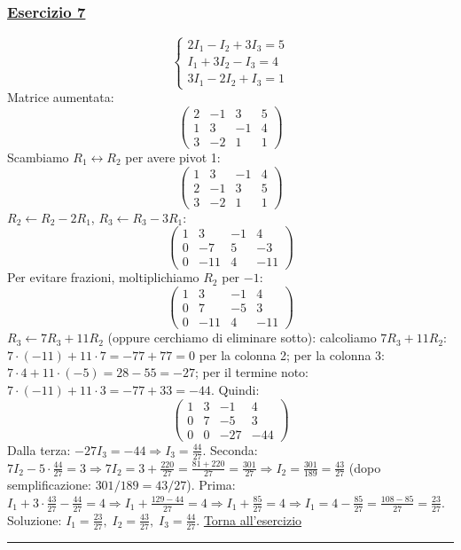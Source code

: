 \subsubsection*{\hyperref[ex:7]{Esercizio 7}}
\[
\begin{cases}
2I_1 - I_2 + 3I_3 = 5 \\
I_1 + 3I_2 - I_3 = 4 \\
3I_1 - 2I_2 + I_3 = 1
\end{cases}
\]
Matrice aumentata:
\[
\left(\begin{array}{ccc|c}
2 & -1 & 3 & 5 \\
1 & 3 & -1 & 4 \\
3 & -2 & 1 & 1
\end{array}\right)
\]
Scambiamo \(R_1 \leftrightarrow R_2\) per avere pivot 1:
\[
\left(\begin{array}{ccc|c}
1 & 3 & -1 & 4 \\
2 & -1 & 3 & 5 \\
3 & -2 & 1 & 1
\end{array}\right)
\]
\(R_2 \leftarrow R_2 - 2R_1\), \(R_3 \leftarrow R_3 - 3R_1\):
\[
\left(\begin{array}{ccc|c}
1 & 3 & -1 & 4 \\
0 & -7 & 5 & -3 \\
0 & -11 & 4 & -11
\end{array}\right)
\]
Per evitare frazioni, moltiplichiamo \(R_2\) per \(-1\):
\[
\left(\begin{array}{ccc|c}
1 & 3 & -1 & 4 \\
0 & 7 & -5 & 3 \\
0 & -11 & 4 & -11
\end{array}\right)
\]
\(R_3 \leftarrow 7R_3 + 11R_2\) (oppure cerchiamo di eliminare sotto): calcoliamo \(7R_3 + 11R_2\):
\(7\cdot(-11) + 11\cdot7 = -77+77=0\) per la colonna 2; per la colonna 3: \(7\cdot4 + 11\cdot(-5) = 28 -55 = -27\); per il termine noto: \(7\cdot(-11) + 11\cdot3 = -77 +33 = -44\). Quindi:
\[
\left(\begin{array}{ccc|c}
1 & 3 & -1 & 4 \\
0 & 7 & -5 & 3 \\
0 & 0 & -27 & -44
\end{array}\right)
\]
Dalla terza: \(-27I_3 = -44 \Rightarrow I_3 = \frac{44}{27}\).
Seconda: \(7I_2 -5\cdot\frac{44}{27} = 3 \Rightarrow 7I_2 = 3 + \frac{220}{27} = \frac{81+220}{27} = \frac{301}{27} \Rightarrow I_2 = \frac{301}{189} = \frac{43}{27}\) (dopo semplificazione: \(301/189 = 43/27\)).
Prima: \(I_1 + 3\cdot\frac{43}{27} - \frac{44}{27} = 4 \Rightarrow I_1 + \frac{129-44}{27} = 4 \Rightarrow I_1 + \frac{85}{27} = 4 \Rightarrow I_1 = 4 - \frac{85}{27} = \frac{108-85}{27} = \frac{23}{27}\).
Soluzione: \(\displaystyle I_1 = \frac{23}{27},\; I_2 = \frac{43}{27},\; I_3 = \frac{44}{27}\). \hfill \hyperlink{ex:7}{Torna all'esercizio}\\
\hrule

